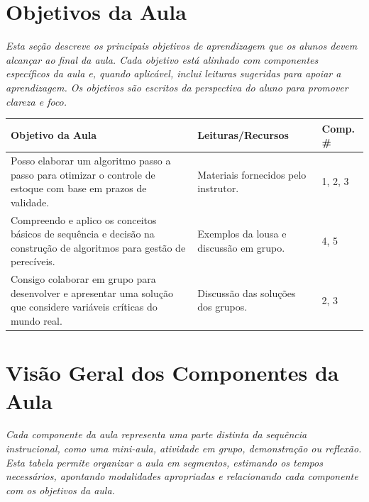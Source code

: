 \documentclass{lesson_plan}
\begin{document}
\PrintLessonHeader
\PrintSummaryTable

\tableofcontents
\newpage

\section{Objetivos da Aula}
\textit{
Esta seção descreve os principais objetivos de aprendizagem que os alunos devem alcançar ao final da aula. Cada objetivo está alinhado com componentes específicos da aula e, quando aplicável, inclui leituras sugeridas para apoiar a aprendizagem. Os objetivos são escritos da perspectiva do aluno para promover clareza e foco.}

\begin{center}
\renewcommand{\arraystretch}{1.5}
\begin{tabular}{|p{9cm}|p{6cm}|p{3cm}|}
\hline
\textbf{Objetivo da Aula} & \textbf{Leituras/Recursos} & \textbf{Comp. \#} \\
\hline
Posso elaborar um algoritmo passo a passo para otimizar o controle de estoque com base em prazos de validade. & Materiais fornecidos pelo instrutor. & 1, 2, 3 \\
\hline
Compreendo e aplico os conceitos básicos de sequência e decisão na construção de algoritmos para gestão de perecíveis. & Exemplos da lousa e discussão em grupo. & 4, 5 \\
\hline
Consigo colaborar em grupo para desenvolver e apresentar uma solução que considere variáveis críticas do mundo real. & Discussão das soluções dos grupos. & 2, 3 \\
\hline
\end{tabular}
\end{center}

\vspace{1cm}
\newpage

\section{Visão Geral dos Componentes da Aula}
\textit{
Cada componente da aula representa uma parte distinta da sequência instrucional, como uma mini-aula, atividade em grupo, demonstração ou reflexão. Esta tabela permite organizar a aula em segmentos, estimando os tempos necessários, apontando modalidades apropriadas e relacionando cada componente com os objetivos da aula.}
\vspace{1em}
\end{document}
